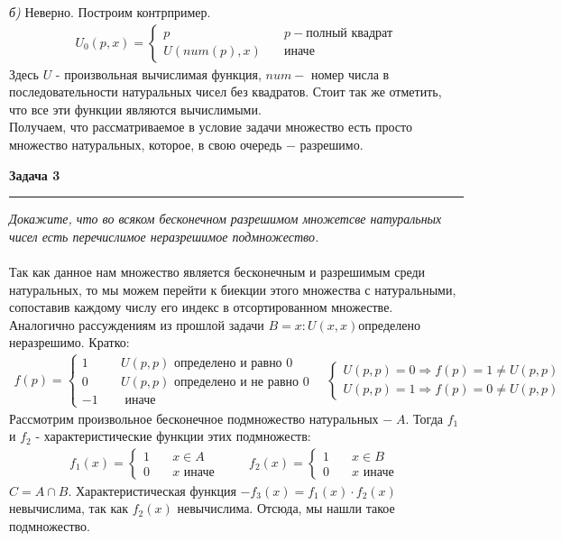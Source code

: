 \documentclass[a4paper,11pt]{article}
\begin{document}
\textsl{б) } Неверно. Построим контрпример. 
\begin{gather*}
U_0(p, x) = 
\begin{cases}
p \quad &p - \text{полный квадрат} \\
U(num(p), x) \quad &\text{иначе}
\end{cases}
\end{gather*}
Здесь $ U $ - произвольная вычислимая функция, $ num - $ номер числа в последовательности натуральных чисел без квадратов. Стоит так же отметить, что все эти функции являются вычислимыми. \\[2pt]
Получаем, что рассматриваемое в условие задачи множество есть просто множество натуральных, которое, в свою очередь $ - $ разрешимо.
\newpage





\textbf{\large Задача 3}
\medskip\hrule\medskip
\textit{Докажите, что во всяком бесконечном разрешимом множетсве натуральных чисел есть перечислимое неразрешимое подмножество.} \\ \\

Так как данное нам множество является бесконечным и  разрешимым среди натуральных, то мы можем перейти к биекции этого множества с натуральными, сопоставив каждому числу его индекс в отсортированном множестве. \\
Аналогично рассуждениям из прошлой задачи $ B = {x : U(x, x) определено} $ неразрешимо. Кратко:
\begin{gather*}
f(p) = 
\begin{cases}
1 \quad & U(p, p) \text{ определено и равно 0} \\
0 \quad & U(p, p) \text{ определено и не равно 0} \\
-1 \quad & \text{ иначе }
\end{cases}
\quad
\begin{cases}
U(p, p) = 0 \Rightarrow f(p) = 1 \neq U(p, p) \\
U(p, p) = 1 \Rightarrow f(p) = 0 \neq U(p, p)
\end{cases}
\end{gather*}
Рассмотрим произвольное бесконечное подмножество натуральных $- \; A $. Тогда $ f_1 $ и $ f_2 $ - характеристические функции этих подмножеств:
\begin{gather*}
f_1(x) = 
\begin{cases}
1 \quad &x \in A \\
0 \quad &x \text{ иначе }
\end{cases}
\qquad
f_2(x) = 
\begin{cases}
1 \quad &x \in B \\
0 \quad &x \text{ иначе }
\end{cases}  
\end{gather*}
$ C = A \cap B $. Характеристическая функция $ - f_3(x) = f_1(x) \cdot f_2(x) $
невычислима, так как $ f_2(x) $ невычислима. Отсюда, мы нашли такое подмножество.
\\ \\ \\
\end{document}

